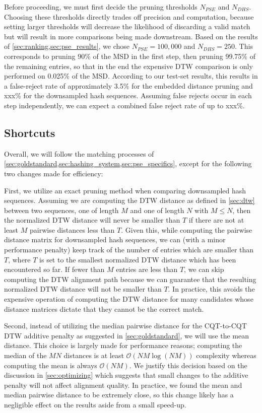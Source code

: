 Before proceeding, we must first decide the pruning thresholds $N_{PSE}$ and $N_{DHS}$.
Choosing these thresholds directly trades off precision and computation, because setting larger thresholds will decrease the likelihood of discarding a valid match but will result in more comparisons being made downstream.
Based on the results of \cref{sec:ranking,sec:pse_results}, we chose $N_{PSE} = 100,000$ and $N_{DHS} = 250$.
This corresponds to pruning 90\% of the MSD in the first step, then pruning 99.75\% of the remaining entries, so that in the end the expensive DTW comparison is only performed on 0.025\% of the MSD.
According to our test-set results, this results in a false-reject rate of approximately 3.5\% for the embedded distance pruning and xxx\% for the downsampled hash sequences.
Assuming false rejects occur in each step independently, we can expect a combined false reject rate of up to xxx\%.

\subsection{Shortcuts}

Overall, we will follow the matching processes of \cref{sec:goldstandard,sec:hashing_system,sec:pse_specifics}, except for the following two changes made for efficiency:

First, we utilize an exact pruning method when comparing downsampled hash sequences.
Assuming we are computing the DTW distance as defined in \cref{sec:dtw} between two sequences, one of length $M$ and one of length $N$ with $M \le N$, then the normalized DTW distance will never be smaller than $T$ if there are not at least $M$ pairwise distances less than $T$.
Given this, while computing the pairwise distance matrix for downsampled hash sequences, we can (with a minor performance penalty) keep track of the number of entries which are smaller than $T$, where $T$ is set to the smallest normalized DTW distance which has been encountered so far.
If fewer than $M$ entries are less than $T$, we can skip computing the DTW alignment path because we can guarantee that the resulting normalized DTW distance will not be smaller than $T$.
In practice, this avoids the expensive operation of computing the DTW distance for many candidates whose distance matrices dictate that they cannot be the correct match.

Second, instead of utilizing the median pairwise distance for the CQT-to-CQT DTW additive penalty as suggested in \cref{sec:goldstandard}, we will use the mean distance.
This choice is largely made for performance reasons; computing the median of the $MN$ distances is at least $\mathcal{O}( NM\log(NM) )$ complexity whereas computing the mean is always $\mathcal{O}(NM)$.
We justify this decision based on the discussion in \cref{sec:optimizing} which suggests that small changes to the additive penalty will not affect alignment quality.
In practice, we found the mean and median pairwise distance to be extremely close, so this change likely has a negligible effect on the results aside from a small speed-up.

